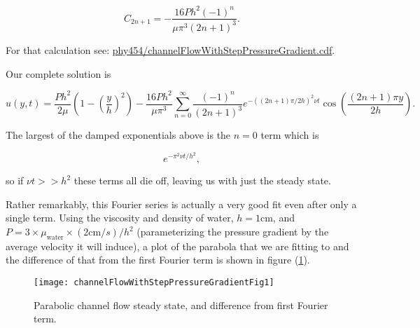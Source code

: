 \begin{equation}\label{eqn:channelFlowWithStepPressureGradient:530}
C_{2 n + 1} = -\frac{16 P h^2 (-1)^n}{\mu \pi^3 (2 n + 1)^3}.
\end{equation}

For that calculation see: \href{https://raw.github.com/peeterjoot/physicsplay/master/notes/phy454/channelFlowWithStepPressureGradient.cdf}{phy454/channelFlowWithStepPressureGradient.cdf}.

Our complete solution is

\begin{equation}\label{eqn:channelFlowWithStepPressureGradient:550}
u(y, t) =
\frac{P h^2}{2 \mu} \left( 1 - \left( \frac{y}{h} \right)^2 \right)
- 
\frac{16 P h^2 }{\mu \pi^3 }
\sum_{n = 0}^\infty 
\frac{(-1)^n}{(2 n + 1)^3}
e^{ -((2 n + 1) \pi/2h)^2 \nu t } 
\cos \left( \frac{ (2 n + 1) \pi y }{2 h} \right) .
\end{equation}

The largest of the damped exponentials above is the $n = 0$ term which is

\begin{equation}\label{eqn:channelFlowWithStepPressureGradient:570}
e^{ - \pi^2 \nu t /h^2 },
\end{equation}

so if $\nu t >> h^2$ these terms all die off, leaving us with just the steady state.

Rather remarkably, this Fourier series is actually a very good fit even after only a single term.  Using the viscosity and density of water, $h = 1 \text{cm}$, and $P = 3 \times \mu_{\text{water}} \times (2 \text{cm}/{s})/ h^2$ (parameterizing the pressure gradient by the average velocity it will induce), a plot of the parabola that we are fitting to and the difference of that from the first Fourier term is shown in figure (\ref{fig:channelFlowWithStepPressureGradient:channelFlowWithStepPressureGradientFig1}).

\begin{figure}[htp]
   \centering
   \texttt{[image: channelFlowWithStepPressureGradientFig1]}
   \caption{Parabolic channel flow steady state, and difference from first Fourier term.}\label{fig:channelFlowWithStepPressureGradient:channelFlowWithStepPressureGradientFig1}
\end{figure}

